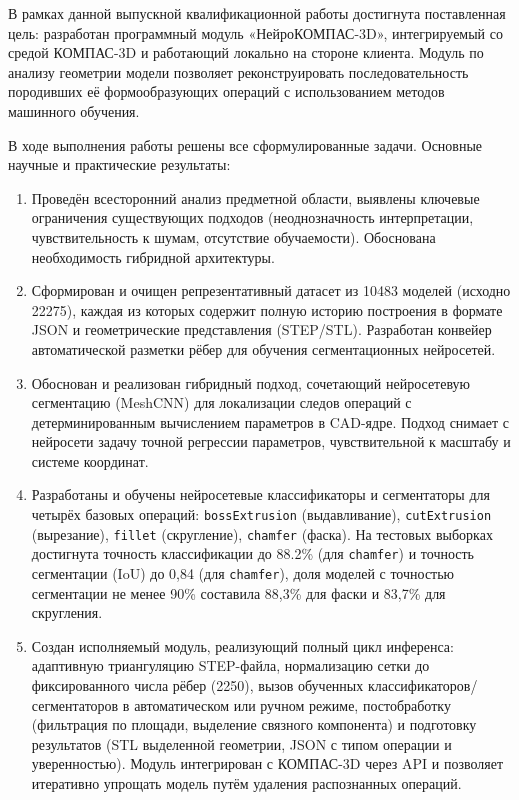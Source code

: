 

В рамках данной выпускной квалификационной работы достигнута поставленная цель: разработан программный модуль «НейроКОМПАС-3D», интегрируемый со средой КОМПАС-3D и работающий локально на стороне клиента. Модуль по анализу геометрии модели позволяет реконструировать последовательность породивших её формообразующих операций с использованием методов машинного обучения.

В ходе выполнения работы решены все сформулированные задачи. Основные научные и практические результаты:

\begin{enumerate}
    \item Проведён всесторонний анализ предметной области, выявлены ключевые ограничения существующих подходов (неоднозначность интерпретации, чувствительность к шумам, отсутствие обучаемости). Обоснована необходимость гибридной архитектуры.
    
    \item Сформирован и очищен репрезентативный датасет из 10483 моделей (исходно 22275), каждая из которых содержит полную историю построения в формате JSON и геометрические представления (STEP/STL). Разработан конвейер автоматической разметки рёбер для обучения сегментационных нейросетей.
    
    \item Обоснован и реализован гибридный подход, сочетающий нейросетевую сегментацию (MeshCNN) для локализации следов операций с детерминированным вычислением параметров в CAD-ядре. Подход снимает с нейросети задачу точной регрессии параметров, чувствительной к масштабу и системе координат.
    
    \item Разработаны и обучены нейросетевые классификаторы и сегментаторы для четырёх базовых операций: \texttt{bossExtrusion} (выдавливание), \texttt{cutExtrusion} (вырезание), \texttt{fillet} (скругление), \texttt{chamfer} (фаска). На тестовых выборках достигнута точность классификации до 88.2\% (для \texttt{chamfer}) и точность сегментации (IoU) до 0,84 (для \texttt{chamfer}), доля моделей с точностью сегментации не менее 90\% составила 88,3\% для фаски и 83,7\% для скругления.
    
    \item Создан исполняемый модуль, реализующий полный цикл инференса: адаптивную триангуляцию STEP-файла, нормализацию сетки до фиксированного числа рёбер (2250), вызов обученных классификаторов/сегментаторов в автоматическом или ручном режиме, постобработку (фильтрация по площади, выделение связного компонента) и подготовку результатов (STL выделенной геометрии, JSON с типом операции и уверенностью). Модуль интегрирован с КОМПАС-3D через API и позволяет итеративно упрощать модель путём удаления распознанных операций.
\end{enumerate}

